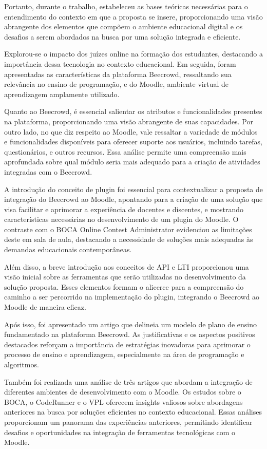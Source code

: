Portanto, durante o trabalho, estabeleceu as bases teóricas necessárias para o entendimento do contexto em que a proposta se insere, proporcionando uma visão abrangente dos elementos que compõem o ambiente educacional digital e os desafios a serem abordados na busca por uma solução integrada e eficiente.

Explorou-se o impacto dos juízes online na formação dos estudantes, destacando a importância dessa tecnologia no contexto educacional. Em seguida, foram apresentadas as características da plataforma Beecrowd, ressaltando sua relevância no ensino de programação, e do Moodle, ambiente virtual de aprendizagem amplamente utilizado.

Quanto ao Beecrowd, é essencial salientar os atributos e funcionalidades presentes na plataforma, proporcionando uma visão abrangente de suas capacidades. Por outro lado, no que diz respeito ao Moodle, vale ressaltar a variedade de módulos e funcionalidades disponíveis para oferecer suporte aos usuários, incluindo tarefas, questionários, e outros recursos. Essa análise permite uma compreensão mais aprofundada sobre qual módulo seria mais adequado para a criação de atividades integradas com o Beecrowd.

A introdução do conceito de plugin foi essencial para contextualizar a proposta de integração do Beecrowd ao Moodle, apontando para a criação de uma solução que visa facilitar e aprimorar a experiência de docentes e discentes, e mostrando características necessárias no desenvolvimento de um plugin do Moodle. O contraste com o BOCA Online Contest Administrator evidenciou as limitações deste em sala de aula, destacando a necessidade de soluções mais adequadas às demandas educacionais contemporâneas.

Além disso, a breve introdução aos conceitos de API e LTI proporcionou uma visão inicial sobre as ferramentas que serão utilizadas no desenvolvimento da solução proposta. Esses elementos formam o alicerce para a compreensão do caminho a ser percorrido na implementação do plugin, integrando o Beecrowd ao Moodle de maneira eficaz.

Após isso, foi apresentado um artigo que delineia um modelo de plano de ensino fundamentado na plataforma Beecrowd. As justificativas e os aspectos positivos destacados reforçam a importância de estratégias inovadoras para aprimorar o processo de ensino e aprendizagem, especialmente na área de programação e algoritmos.

Também foi realizada uma análise de três artigos que abordam a integração de diferentes ambientes de desenvolvimento com o Moodle. Os estudos sobre o BOCA, o CodeRunner e o VPL oferecem insights valiosos sobre abordagens anteriores na busca por soluções eficientes no contexto educacional. Essas análises proporcionam um panorama das experiências anteriores, permitindo identificar desafios e oportunidades na integração de ferramentas tecnológicas com o Moodle.

